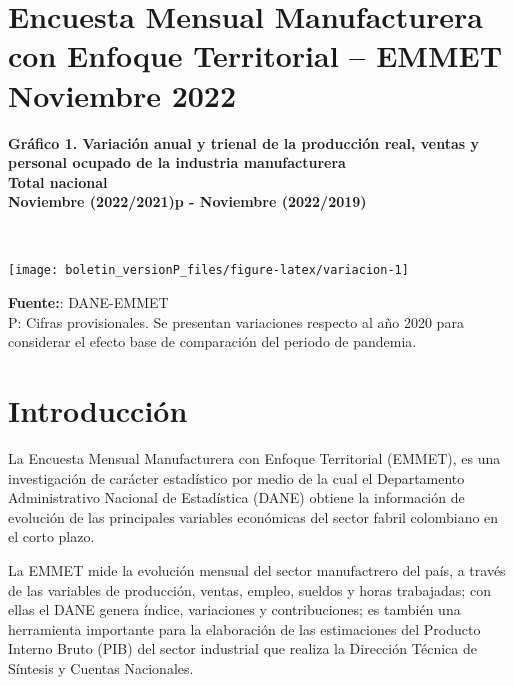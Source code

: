 \documentclass[
]{article}
\author{}
\date{\vspace{-2.5em}}
\begin{document}
\hypertarget{encuesta-mensual-manufacturera-con-enfoque-territorial-emmet-noviembre-2022}{%
\section*{Encuesta Mensual Manufacturera con Enfoque Territorial --
EMMET Noviembre
2022}\label{encuesta-mensual-manufacturera-con-enfoque-territorial-emmet-noviembre-2022}}

\textbf{Gráfico 1. Variación anual y trienal de la producción real,
ventas y personal ocupado de la industria manufacturera}\\
\textbf{Total nacional}\\
\textbf{Noviembre (2022/2021)p - Noviembre (2022/2019)}\\
\strut \\

\begin{center}\texttt{[image: boletin\_versionP\_files/figure-latex/variacion-1]} \end{center}

\textbf{Fuente:}: DANE-EMMET\\
P: Cifras provisionales. Se presentan variaciones respecto al año 2020
para considerar el efecto base de comparación del periodo de pandemia.

\newpage
\renewcommand\contentsname{}
\setcounter{tocdepth}{1}
\tableofcontents

\newpage

\hypertarget{introducciuxf3n}{%
\section*{Introducción}\label{introducciuxf3n}}

La Encuesta Mensual Manufacturera con Enfoque Territorial (EMMET), es
una investigación de carácter estadístico por medio de la cual el
Departamento Administrativo Nacional de Estadística (DANE) obtiene la
información de evolución de las principales variables económicas del
sector fabril colombiano en el corto plazo.

La EMMET mide la evolución mensual del sector manufactrero del país, a
través de las variables de producción, ventas, empleo, sueldos y horas
trabajadas; con ellas el DANE genera índice, variaciones y
contribuciones; es también una herramienta importante para la
elaboración de las estimaciones del Producto Interno Bruto (PIB) del
sector industrial que realiza la Dirección Técnica de Síntesis y Cuentas
Nacionales.
\end{document}
